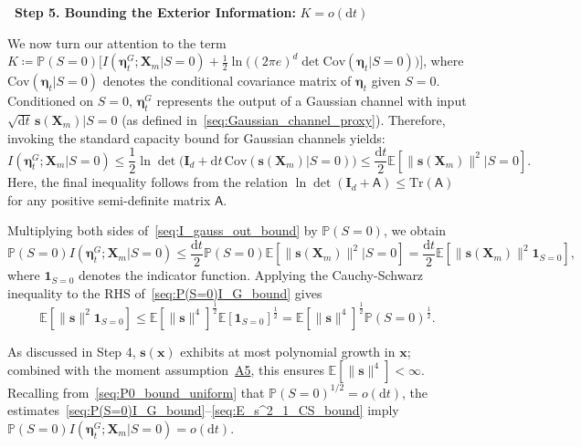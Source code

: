\documentclass[
 longbibliography,
 twocolumn,
 superscriptaddress,
 amsmath,
 amssymb,
 amsthm,
 amsfonts,
 prl,
 floatfix,
]{revtex4-2}
\newcommand{\matbf}[1]{\boldsymbol{\mathsf{#1}}}
\begin{document}
\begin{widetext}
\noindent\textbf{\textbullet\ Step 5. Bounding the Exterior Information:} $K=o(\mathrm dt)$

We now turn our attention to the term $K\coloneq \mathbb P(S=0)\big[I(\bm\eta_t^G;\bm X_m|S=0)+\frac{1}{2}\ln\!\big((2\pi e)^d\det\mathrm{Cov}(\bm\eta_t|S=0)\big)\big]$, where $\mathrm{Cov}(\bm\eta_t|S=0)$ denotes the conditional covariance matrix of $\bm\eta_t$ given $S=0$. Conditioned on $S=0$, $\bm\eta_t^G$ represents the output of a Gaussian channel with input $\sqrt{\mathrm dt}\,\bm s(\bm X_m)|S=0$ (as defined in~\eqref{seq:Gaussian_channel_proxy}). Therefore, invoking the standard capacity bound for Gaussian channels yields:
\begin{equation}
    I(\bm\eta_t^G;\bm X_m|S=0)
    \leq
    \frac{1}{2}\ln\det\!\big(\mathbf I_d
    +\mathrm dt\,\mathrm{Cov}(\bm s(\bm X_m)|S=0)\big)
    \leq
    \frac{\mathrm dt}{2}\mathbb E\!\left[
    \|\bm s(\bm X_m)\|^2|S=0\right].
    \label{seq:I_gauss_out_bound}
\end{equation}
Here, the final inequality follows from the relation $\ln\det(\mathbf I_d+\matbf A)\leq\mathrm{Tr}(\matbf A)$ for any positive semi-definite matrix $\matbf A$.

Multiplying both sides of~\eqref{seq:I_gauss_out_bound} by $\mathbb P(S=0)$, we obtain
\begin{equation}
    \mathbb P(S=0)I(\bm\eta_t^G;\bm X_m|S=0)
    \leq
    \frac{\mathrm dt}{2}\mathbb P(S=0)\mathbb E[\|\bm s(\bm X_m)\|^2|S=0]
    =\frac{\mathrm dt}{2}\mathbb E[\|\bm s(\bm X_m)\|^2\bm 1_{S=0}],
    \label{seq:P(S=0)I_G_bound}
\end{equation}
where $\bm 1_{S=0}$ denotes the indicator function. Applying the Cauchy-Schwarz inequality to the RHS of~\eqref{seq:P(S=0)I_G_bound} gives
\begin{equation}
    \mathbb E[\|\bm s\|^2\bm 1_{S=0}]\leq\mathbb E[\|\bm s\|^4]^{\frac{1}{2}}\mathbb E[\bm 1_{S=0}]^{\frac{1}{2}}
    =\mathbb E[\|\bm s\|^4]^{\frac{1}{2}}\mathbb P(S=0)^{\frac{1}{2}}.
    \label{seq:E_s^2_1_CS_bound}
\end{equation}

As discussed in Step 4, $\bm s(\bm x)$ exhibits at most polynomial growth in $\bm x$; combined with the moment assumption~\hyperlink{assumption:A5}{A5}, this ensures $\mathbb E[\|\bm s\|^4]<\infty$. Recalling from~\eqref{seq:P0_bound_uniform} that $\mathbb P(S=0)^{1/2}=o(\mathrm dt)$, the estimates~\eqref{seq:P(S=0)I_G_bound}--\eqref{seq:E_s^2_1_CS_bound} imply $\mathbb P(S=0)I(\bm\eta_t^G;\bm X_m|S=0)=o(\mathrm dt)$.


\end{widetext}
\end{document}
